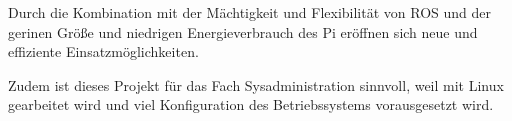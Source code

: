 \documentclass[12pt]{article}
\begin{document}
Durch die Kombination mit der Mächtigkeit und Flexibilität von ROS und der gerinen Größe und niedrigen Energieverbrauch des Pi eröffnen sich neue und effiziente Einsatzmöglichkeiten.

Zudem ist dieses Projekt für das Fach Sysadministration sinnvoll, weil mit Linux gearbeitet wird und viel Konfiguration des Betriebssystems vorausgesetzt wird.














\end{document}

